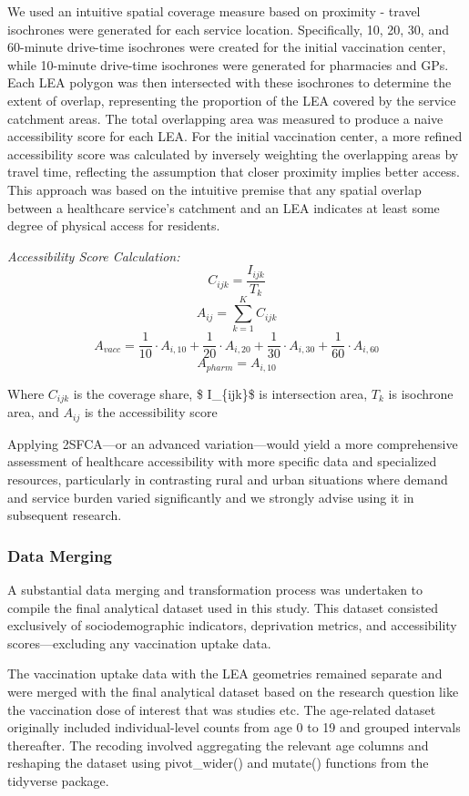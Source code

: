 \documentclass{article}
\begin{document}
We used an intuitive spatial coverage measure based on proximity -
travel isochrones were generated for each service location.
Specifically, 10, 20, 30, and 60-minute drive-time isochrones were
created for the initial vaccination center, while 10-minute drive-time
isochrones were generated for pharmacies and GPs. Each LEA polygon was
then intersected with these isochrones to determine the extent of
overlap, representing the proportion of the LEA covered by the service
catchment areas. The total overlapping area was measured to produce a
naive accessibility score for each LEA. For the initial vaccination
center, a more refined accessibility score was calculated by inversely
weighting the overlapping areas by travel time, reflecting the
assumption that closer proximity implies better access. This approach
was based on the intuitive premise that any spatial overlap between a
healthcare service's catchment and an LEA indicates at least some degree
of physical access for residents.

\emph{Accessibility Score Calculation:}
\[C_{ijk} = \frac{I_{ijk}}{T_k}\] \[A_{ij} = \sum_{k=1}^{K} C_{ijk}\]
\[A_{vacc} = \frac{1}{10} \cdot A_{i,10} + \frac{1}{20} \cdot A_{i,20} + \frac{1}{30} \cdot A_{i,30} + \frac{1}{60} \cdot A_{i,60}\]
\[A_{pharm} = A_{i,10}\]

Where \(C_{ijk}\) is the coverage share, \$ I\_\{ijk\}\$ is intersection
area, \(T_k\) is isochrone area, and \(A_{ij}\) is the accessibility
score

Applying 2SFCA---or an advanced variation---would yield a more
comprehensive assessment of healthcare accessibility with more specific
data and specialized resources, particularly in contrasting rural and
urban situations where demand and service burden varied significantly
and we strongly advise using it in subsequent research.

\subsubsection{Data Merging}\label{data-merging}

A substantial data merging and transformation process was undertaken to
compile the final analytical dataset used in this study. This dataset
consisted exclusively of sociodemographic indicators, deprivation
metrics, and accessibility scores---excluding any vaccination uptake
data.

The vaccination uptake data with the LEA geometries remained separate
and were merged with the final analytical dataset based on the research
question like the vaccination dose of interest that was studies etc. The
age-related dataset originally included individual-level counts from age
0 to 19 and grouped intervals thereafter. The recoding involved
aggregating the relevant age columns and reshaping the dataset using
pivot\_wider() and mutate() functions from the tidyverse package.
\end{document}
